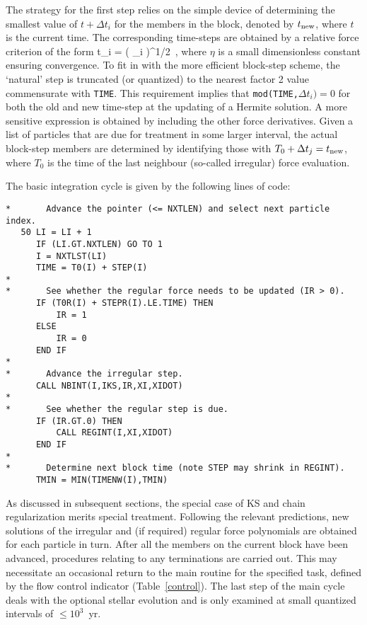 \documentclass[12pt]{article}
\begin{document}
The strategy for the first step relies on the simple device of determining
the smallest value of $t + \Delta t_i$ for the members in the block, denoted
by $t_{\rm new}$, where $t$ is the current time.
The corresponding time-steps are obtained by a relative force criterion of
the form
\be
\Delta t_i = 
\left( 
 {{}_i \vert} \right)^{1/2} \,,
\ee
where $\eta$ is a small dimensionless constant ensuring convergence.
To fit in with the more efficient block-step scheme, the `natural' step
is truncated (or quantized) to the nearest factor 2 value commensurate with
{\tt TIME}.
This requirement implies that {\tt mod(TIME,$\Delta t_i)=0$} for
both the old and new time-step at the updating of a Hermite solution.
A more sensitive expression is obtained by including the other force
derivatives.
Given a list of particles that are due for treatment in some larger
interval, the actual block-step members are determined by identifying
those with $T_0 + \Delta t_j = t_{\rm new}$, where $T_0$ is the time
of the last neighbour (so-called irregular) force evaluation.

The basic integration cycle is given by the following lines of code:

\begin{verbatim}
*       Advance the pointer (<= NXTLEN) and select next particle index.
   50 LI = LI + 1
      IF (LI.GT.NXTLEN) GO TO 1
      I = NXTLST(LI)
      TIME = T0(I) + STEP(I)
*
*       See whether the regular force needs to be updated (IR > 0).
      IF (T0R(I) + STEPR(I).LE.TIME) THEN
          IR = 1
      ELSE
          IR = 0
      END IF
*
*       Advance the irregular step.
      CALL NBINT(I,IKS,IR,XI,XIDOT)
*
*       See whether the regular step is due.
      IF (IR.GT.0) THEN
          CALL REGINT(I,XI,XIDOT)
      END IF
*
*       Determine next block time (note STEP may shrink in REGINT).
      TMIN = MIN(TIMENW(I),TMIN)
\end{verbatim}

As discussed in subsequent sections, the special case of KS and chain
regularization merits special treatment.
Following the relevant predictions, new solutions of the irregular and
(if required) regular force polynomials are obtained for each particle
in turn.
After all the members on the current block have been advanced, procedures
relating to any terminations are carried out.
This may necessitate an occasional return to the main routine for the
specified task, defined by the flow control indicator
(\cf Table~\ref{control}).
The last step of the main cycle deals with the optional stellar evolution
and is only examined at small quantized intervals of $\le 10^3$~yr.
\end{document}
